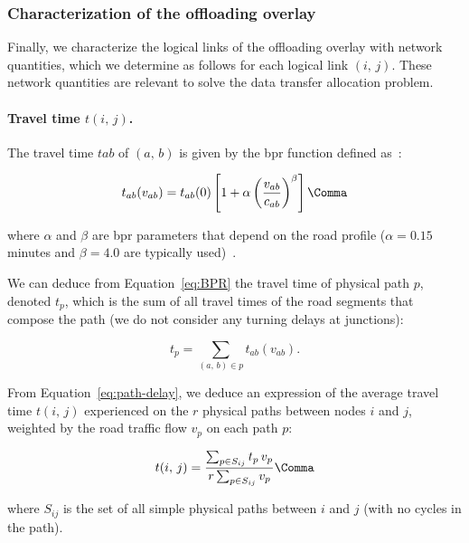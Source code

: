 \subsubsection{Characterization of the offloading overlay} 
\label{sec:characterization-offloading-overlay}

Finally, we characterize the logical links of the offloading overlay with network quantities, which we determine as follows for each logical link $(i,\,j)$. These network quantities are relevant to solve the data transfer allocation problem.

\paragraph{Travel time $t(i,\,j)$.} 
 The travel time $t{ab}$ of $(a,\,b)$ is given by the \acrfull{bpr} function defined as~\cite{BPR64}:

\begin{equation}
  \label{eq:BPR}
  t_{ab}(v_{ab})=t_{ab}(0)\left[1+\alpha\left(\frac{v_{ab}}{c_{ab}}\right)^{\beta}\right]\Comma
\end{equation}

\noindent where $\alpha$ and $\beta$ are \acrshort{bpr} parameters that depend on the road profile ($\alpha = 0.15$ minutes and $\beta = 4.0$ are typically used)~\cite{HCM00}.

We can deduce from Equation~\ref{eq:BPR} the travel time of physical path $p$, denoted $t_{p}$, which is the sum of all travel times of the road segments that compose the path (we do not consider any turning delays at junctions):

\begin{equation}
  \label{eq:path-delay}
  t_{p} = \sum_{(a,\,b)\in p} t_{ab}(v_{ab}).
\end{equation}

From Equation~\ref{eq:path-delay}, we deduce an expression of the average travel time $t(i,\,j)$ experienced on the $r$ physical paths between nodes $i$ and $j$, weighted by the road traffic flow $v_{p}$ on each path $p$:

\begin{equation}
  \label{eq:ovelray-link-delay}
  t(i,\,j) = \frac{\sum_{p\in S_{ij}} t_{p}\,v_{p}}{r\sum_{p\in S_{ij}}v_{p}}\Comma
\end{equation}

\noindent where $S_{ij}$ is the set of all simple physical paths between $i$ and $j$ (\ie with no cycles in the path).

